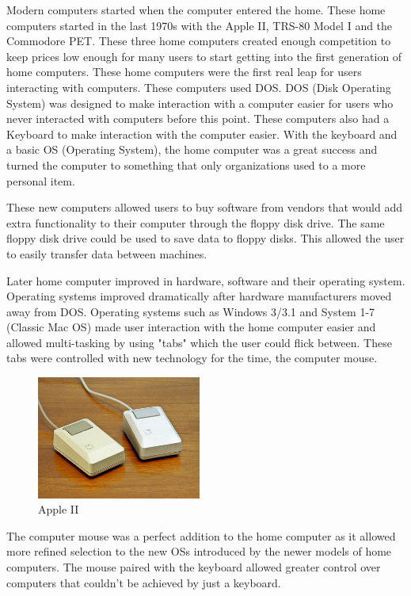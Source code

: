 Modern computers started when the computer entered the home. \cite{homecomputers} These home computers started in the last 1970s with the Apple II, TRS-80 Model I and the Commodore PET. These three home computers created enough competition to keep prices low enough for many users to start getting into the first generation of home computers. These home computers were the first real leap for users interacting with computers. These computers used DOS. \cite{dos} DOS (Disk Operating System) was designed to make interaction with a computer easier for users who never interacted with computers before this point. These computers also had a Keyboard to make interaction with the computer easier. With the keyboard and a basic OS (Operating System), the home computer was a great success and turned the computer to something that only organizations used to a more personal item.

These new computers allowed users to buy software from vendors that would add extra functionality to their computer through the floppy disk drive. The same floppy disk drive could be used to save data to floppy disks. This allowed the user to easily transfer data between machines.

Later home computer improved in hardware, software and their operating system. Operating systems improved dramatically after hardware manufacturers moved away from DOS. Operating systems such as Windows 3/3.1 and System 1-7 (Classic Mac OS) made user interaction with the home computer easier and allowed multi-tasking by using "tabs" which the user could flick between. These tabs were controlled with new technology for the time, the computer mouse. 

\begin{figure}
  \begin{center}
    \includegraphics[width=0.48\textwidth]{img/mouse.jpg}
  \end{center}
  \caption{Apple II}
\end{figure}

The computer mouse was a perfect addition to the home computer as it allowed more refined selection to the new OSs introduced by the newer models of home computers. The mouse paired with the keyboard allowed greater control over computers that couldn't be achieved by just a keyboard. 

